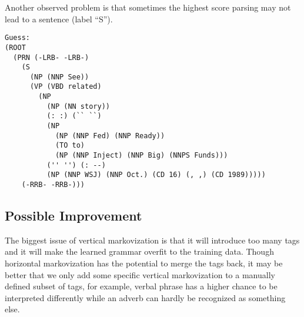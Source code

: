 \documentclass[letterpaper]{article}
\begin{document}
Another observed problem is that sometimes the highest score parsing may not lead to a sentence
(label ``S'').
\begin{verbatim}
Guess:
(ROOT
  (PRN (-LRB- -LRB-)
    (S
      (NP (NNP See))
      (VP (VBD related)
        (NP
          (NP (NN story))
          (: :) (`` ``)
          (NP
            (NP (NNP Fed) (NNP Ready))
            (TO to)
            (NP (NNP Inject) (NNP Big) (NNPS Funds)))
          ('' '') (: --)
          (NP (NNP WSJ) (NNP Oct.) (CD 16) (, ,) (CD 1989)))))
    (-RRB- -RRB-)))
\end{verbatim}

\subsection{Possible Improvement}
The biggest issue of vertical markovization is that it will introduce too many tags and it will make the learned grammar overfit to the training data. Though horizontal markovization has the potential to merge the tags back, it may be better that we only add some specific vertical markovization to a manually defined subset of tags, for example, verbal phrase has a higher chance to be interpreted differently while an adverb can hardly be recognized as something else.
\end{document}
